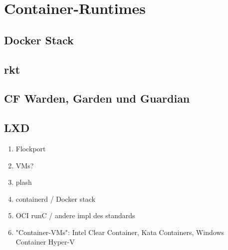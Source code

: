 \chapter{Container-Runtimes}
\label{chap:compCtnrRuntimes}


\section{Docker Stack}
\label{sec:compDocker}

\section{rkt}
\label{sec:compRkt}

\section{CF Warden, Garden und Guardian}
\label{sec:compCF}

\section{LXD}
\label{sec:compLXD}

\begin{enumerate}
	\item Flockport
	\item VMs?
	\item plash
	\item containerd / Docker stack
	\item OCI runC / andere impl des standards
	\item "Container-VMs": Intel Clear Container, Kata Containers, Windows Container Hyper-V
\end{enumerate}